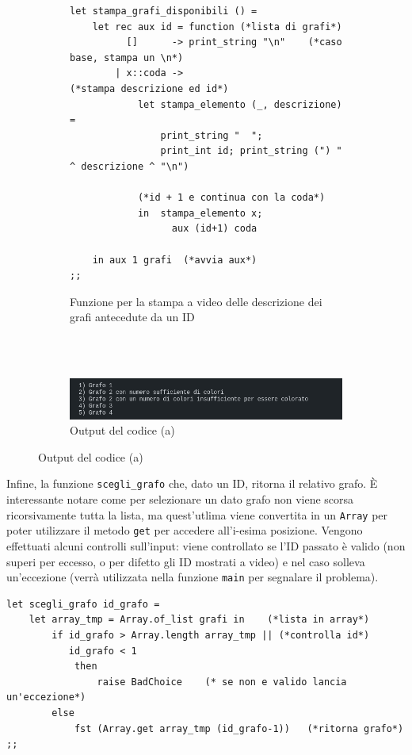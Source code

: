 \begin{figure}[H]
	\begin{subfigure}{\textwidth}

\begin{lstlisting}[style=caml]
let stampa_grafi_disponibili () = 
	let rec aux id = function (*lista di grafi*)
		  []      -> print_string "\n"    (*caso base, stampa un \n*)
		| x::coda ->                      (*stampa descrizione ed id*)
			let stampa_elemento (_, descrizione) = 
				print_string "  "; 
				print_int id; print_string (") " ^ descrizione ^ "\n")

			(*id + 1 e continua con la coda*)
			in  stampa_elemento x;    
				  aux (id+1) coda     

	in aux 1 grafi  (*avvia aux*)
;;
\end{lstlisting}
		\caption{Funzione per la stampa a video delle descrizione dei grafi antecedute da un ID}
	\end{subfigure}
\ \\
\ \\
	\begin{subfigure}{\textwidth}
		\includegraphics[width=\textwidth]{img/descrizione_grafi.png}
		\caption{Output del codice (a)}
	\end{subfigure}
\end{figure}

Infine, la funzione \lstinline[style=cmd]|scegli_grafo| che, dato un ID, ritorna il relativo grafo. \`{E} interessante notare come per selezionare un dato grafo non viene scorsa ricorsivamente tutta la lista, ma quest'utlima viene convertita in un \lstinline[style=cmd]|Array| per poter utilizzare il metodo \lstinline[style=cmd]|get| per accedere all'i-esima posizione. Vengono effettuati alcuni controlli sull'input: viene controllato se l'ID passato è valido (non superi per eccesso, o per difetto gli ID mostrati a video) e nel caso solleva un'eccezione (verrà utilizzata nella funzione \lstinline[style=cmd]|main| per segnalare il problema). %

\begin{lstlisting}[style=caml, caption={Funzione che ritorna il grafo selezionato}]
let scegli_grafo id_grafo =
	let array_tmp = Array.of_list grafi in    (*lista in array*)
		if id_grafo > Array.length array_tmp || (*controlla id*)
		   id_grafo < 1  
			then 
				raise BadChoice    (* se non e valido lancia un'eccezione*)
		else
			fst (Array.get array_tmp (id_grafo-1))   (*ritorna grafo*)
;; 
\end{lstlisting}

